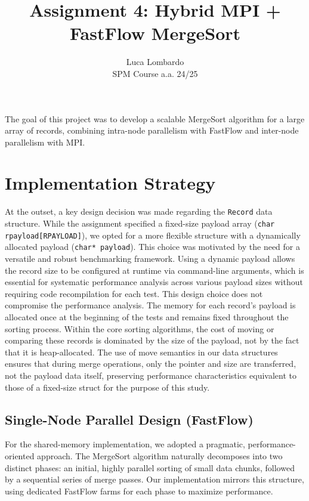 \documentclass[10pt]{article}
\title{Assignment 4: Hybrid MPI + FastFlow MergeSort}
\author{Luca Lombardo \\ SPM Course a.a. 24/25}
\date{}
\newcommand{\code}[1]{\texttt{#1}}
\begin{document}
\maketitle
\vspace{-1.5em} %


The goal of this project was to develop a scalable MergeSort algorithm for a large array of records, combining intra-node parallelism with FastFlow and inter-node parallelism with MPI.
\section{Implementation Strategy}

At the outset, a key design decision was made regarding the \code{Record} data structure. While the assignment specified a fixed-size payload array (\code{char rpayload[RPAYLOAD]}), we opted for a more flexible structure with a dynamically allocated payload (\code{char* payload}). This choice was motivated by the need for a versatile and robust benchmarking framework. Using a dynamic payload allows the record size to be configured at runtime via command-line arguments, which is essential for systematic performance analysis across various payload sizes without requiring code recompilation for each test. This design choice does not compromise the performance analysis. The memory for each record's payload is allocated once at the beginning of the tests and remains fixed throughout the sorting process. Within the core sorting algorithms, the cost of moving or comparing these records is dominated by the size of the payload, not by the fact that it is heap-allocated. The use of move semantics in our data structures ensures that during merge operations, only the pointer and size are transferred, not the payload data itself, preserving performance characteristics equivalent to those of a fixed-size struct for the purpose of this study.



\subsection{Single-Node Parallel Design (FastFlow)}
For the shared-memory implementation, we adopted a pragmatic, performance-oriented approach. The MergeSort algorithm naturally decomposes into two distinct phases: an initial, highly parallel sorting of small data chunks, followed by a sequential series of merge passes. Our implementation mirrors this structure, using dedicated FastFlow farms for each phase to maximize performance.
\end{document}
